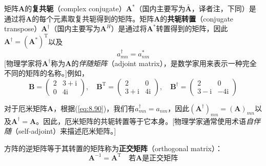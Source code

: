     矩阵$\mathbf{A}$的\textbf{复共轭}（complex conjugate）$\mathbf{A}^{\ast}$（国内主要写为$\bar{\mathbf{A}}$，译者注，下同）是通过将$\mathbf{A}$的每个元素取复共轭得到的矩阵。矩阵$\mathbf{A}$的\textbf{共轭转置}（conjugate transpose）$\mathbf{A}^{\dagger}$（国内主要写为$\mathbf{A}^H$）是通过将$\mathbf{A}^{\ast}$转置得到的矩阵，因此$\mathbf{A}^{\dagger} = \left(\mathbf{A}^{\ast}\right)^{\mathrm{T}}$以及
    \begin{equation}
        a_{mn}^{\dagger} = a_{nm}^{\ast}
        \label{eq:8.90}
    \end{equation}
    [物理学家将$\mathbf{A}^{\dagger}$称为$\mathbf{A}$的\textit{伴随矩阵}（adjoint matrix），是数学家用来表示一种完全不同的矩阵的名称。]例如，
    \begin{equation*}
        \mathbf{B} = \begin{pmatrix}
            2 & 3 + \mathrm{i} \\
            0 & 4\mathrm{i}
        \end{pmatrix}, \quad \mathbf{B}^{\mathrm{T}} = \begin{pmatrix}
            2 & 0 \\
            3 + \mathrm{i} & 4\mathrm{i}
        \end{pmatrix}, \quad \mathbf{B}^{\dagger} = \begin{pmatrix}
            2 & 0 \\
            3 - \mathrm{i} & -4\mathrm{i}
        \end{pmatrix}
    \end{equation*}

    对于厄米矩阵$\mathbf{A}$，根据(\ref{eq:8.90})，我们有$a_{mn}^{\dagger} = a_{nm}$，因此$\left(\mathbf{A}^{\dagger}\right)_{mn} = \left(\mathbf{A}\right)_{mn}$以及$\mathbf{A}^{\dagger} = \mathbf{A}$。因此，厄米矩阵的共轭转置等于它本身。[物理学家通常使用术语\textit{自伴随}（self-adjoint）来描述厄米矩阵。] 

    方阵的逆矩阵等于其转置的矩阵称为\textbf{正交矩阵}（orthogonal matrix）：
    \begin{equation}
        \mathbf{A}^{-1} = \mathbf{A}^{\mathrm{T}} \quad \text{若} \mathbf{A} \text{是正交矩阵}
        \label{eq:8.91}
    \end{equation}

